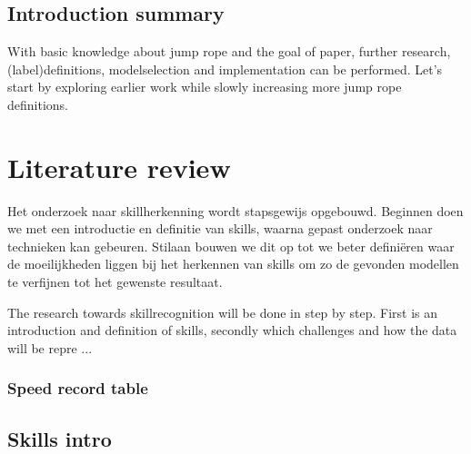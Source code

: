 \subsection{Introduction summary}

With basic knowledge about jump rope and the goal of paper, further research, (label)definitions, modelselection and implementation can be performed. Let's start by exploring earlier work while slowly increasing more jump rope definitions.




\section{Literature review}%
\label{sec:literature}


    
Het onderzoek naar skillherkenning wordt stapsgewijs opgebouwd. Beginnen doen we met een introductie en definitie van skills, waarna gepast onderzoek naar technieken kan gebeuren. Stilaan bouwen we dit op tot we beter definiëren waar de moeilijkheden liggen bij het herkennen van skills om zo de gevonden modellen te verfijnen tot het gewenste resultaat.

The research towards skillrecognition will be done in step by step. First is an introduction and definition of skills, secondly which challenges and how the data will be repre ... %

\subsubsection{Speed record table}

\subsection{Skills intro}
\label{subsec:basisskills}


